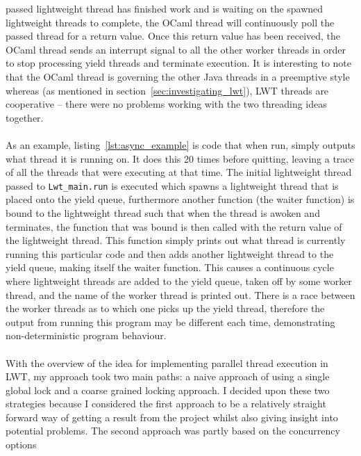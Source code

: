 \documentclass[12pt,twoside,notitlepage]{report}
\begin{document}
passed lightweight thread has finished work and is waiting on the spawned lightweight threads to complete, the OCaml thread will continuously poll the passed thread for a return value. Once this return value has been received, the OCaml thread
sends an interrupt signal to all the other worker threads in order to stop processing yield threads and terminate execution.  It is interesting to note that the OCaml thread is governing the other Java threads in a preemptive style
whereas (as mentioned in section~\ref{sec:investigating_lwt}), LWT threads are cooperative -- there were no problems working with the two threading ideas together.
\hfill\\

\hfill\\
%
%
As an example, listing~\ref{lst:async_example} is code that when run, simply outputs what thread it is running on. It does this 20 times before quitting, leaving a trace of all the threads that
were executing at that time. The initial lightweight thread passed to {\tt Lwt\_main.run} is executed which spawns a lightweight thread that is placed onto the yield queue, furthermore another function (the waiter function) is bound
to the lightweight thread such that when the thread is awoken and terminates, the function that was bound is then called with the return value of the lightweight thread. This function simply prints out what thread is currently running this
particular code and then adds another lightweight thread to the yield queue, making itself the waiter function. This causes a continuous cycle where lightweight threads are added to the yield queue, taken off by some worker thread, and the name of the worker
thread is printed out. There is a race between the worker threads as to which one picks up the yield thread, therefore the output from running this program may be different each time, demonstrating non-deterministic program
behaviour.
\hfill\\

\hfill\\
With the overview of the idea for implementing parallel thread execution in LWT, my approach took two main paths: a naive approach of using a single global lock and a coarse grained locking approach. I decided upon these two strategies
because I considered the first approach to be a relatively straight forward way of getting a result from the project whilst also giving insight into potential problems. The second approach was partly based on the concurrency options
\end{document}
